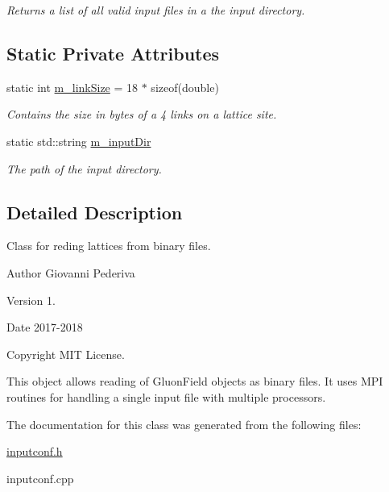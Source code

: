 \begin{DoxyCompactItemize}
\begin{DoxyCompactList}\small\item\em Returns a list of all valid input files in a the input directory. \end{DoxyCompactList}\end{DoxyCompactItemize}
\subsection*{Static Private Attributes}
\begin{DoxyCompactItemize}
\item 
static int \hyperlink{classLatticeIO_1_1InputConf_a1f6a72c39487a0b44cacd27b15a0df0d}{m\+\_\+link\+Size} = 18 $\ast$ sizeof(double)\hypertarget{classLatticeIO_1_1InputConf_a1f6a72c39487a0b44cacd27b15a0df0d}{}\label{classLatticeIO_1_1InputConf_a1f6a72c39487a0b44cacd27b15a0df0d}

\begin{DoxyCompactList}\small\item\em Contains the size in bytes of a 4 links on a lattice site. \end{DoxyCompactList}\item 
static std\+::string \hyperlink{classLatticeIO_1_1InputConf_ac2dcaeda7ddb006f1446b53f5ec6f168}{m\+\_\+input\+Dir}\hypertarget{classLatticeIO_1_1InputConf_ac2dcaeda7ddb006f1446b53f5ec6f168}{}\label{classLatticeIO_1_1InputConf_ac2dcaeda7ddb006f1446b53f5ec6f168}

\begin{DoxyCompactList}\small\item\em The path of the input directory. \end{DoxyCompactList}\end{DoxyCompactItemize}


\subsection{Detailed Description}
Class for reding lattices from binary files. 

\begin{DoxyAuthor}{Author}
Giovanni Pederiva 
\end{DoxyAuthor}
\begin{DoxyVersion}{Version}
1. 
\end{DoxyVersion}
\begin{DoxyDate}{Date}
2017-\/2018 
\end{DoxyDate}
\begin{DoxyCopyright}{Copyright}
M\+IT License.
\end{DoxyCopyright}
This object allows reading of Gluon\+Field objects as binary files. It uses M\+PI routines for handling a single input file with multiple processors. 

The documentation for this class was generated from the following files\+:\begin{DoxyCompactItemize}
\item 
\hyperlink{inputconf_8h}{inputconf.\+h}\item 
inputconf.\+cpp\end{DoxyCompactItemize}
